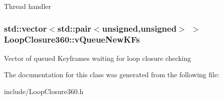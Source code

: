 Thread handler \hypertarget{classLoopClosure360_ae1ffbca60947fcbede7b879eba8fff6d}{
\subsubsection[{v\-Queue\-New\-K\-Fs}]{\setlength{\rightskip}{0pt plus 5cm}std\-::vector$<$std\-::pair$<$unsigned,unsigned$>$ $>$ Loop\-Closure360\-::v\-Queue\-New\-K\-Fs\hspace{0.3cm}{\ttfamily [private]}}}\label{classLoopClosure360_ae1ffbca60947fcbede7b879eba8fff6d}
Vector of queued Keyframes waiting for loop closure checking 

The documentation for this class was generated from the following file\-:\begin{DoxyCompactItemize}
\item 
include/Loop\-Closure360.\-h\end{DoxyCompactItemize}
